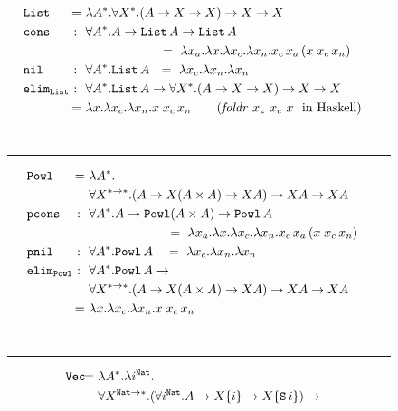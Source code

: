 \begin{figure}
\begin{align*}
&\!\!\!\!\!\!\mathtt{List} &\!\!\!\!\!=~& \l A^{*}.\forall X^{*}.(A-> X-> X)-> X-> X
	\\
&\!\!\!\!\!\!\texttt{cons} &\!\!\!\!\!:~~& \forall A^{*}.A-> \mathtt{List}\,A-> \mathtt{List}\,A \\
& & & \qquad~\qquad~\quad\, =~\l x_a.\l x.\l x_c.\l x_n. x_c\,x_a\,(x\;x_c\,x_n) \\
&\!\!\!\!\!\!\mathtt{nil} &\!\!\!\!\!:~~& \forall A^{*}.\texttt{List}\,A
~~=~ \l x_c.\l x_n.\l x_n \\
&\!\!\!\!\!\!\mathtt{elim_{List}} &\!\!\!\!:~~& \forall A^{*}.\texttt{List}\,A ->
	\forall X^{*}.(A -> X -> X) -> X -> X \\
& &\!\!\!\!\!=~& \l x.\l x_c. \l x_n.x\;x_c\,x_n\qquad
	\text{(\textit{foldr} $x_z$ $x_c$ $x~$ in Haskell)}
\end{align*}\vspace*{-19pt} \\ \vspace*{-4pt}
\rule{\linewidth}{.4pt}
\begin{align*}
&\!\!\!\!\!\!\mathtt{Powl} &\!\!\!\!\!=~& \l A^{*}.\\
&&&\forall X^{*-> *}.(A-> X(A\times A)-> XA)-> XA -> XA \\
&\!\!\!\!\!\!\texttt{pcons} &\!\!\!\!\!:~~& \forall A^{*}.A-> \mathtt{Powl}(A\times A)-> \mathtt{Powl}\,A \\
&&& \qquad~\qquad~\quad\, ~=~ \l x_a.\l x.\l x_c.\l x_n. x_c\,x_a\,(x\;x_c\,x_n) \\
&\!\!\!\!\!\!\mathtt{pnil} &\!\!\!\!\!:~~& \forall A^{*}.\texttt{Powl}\,A
~~~=~ \l x_c.\l x_n.\l x_n \\
&\!\!\!\!\!\!\mathtt{elim_{Powl}} &\!\!\!\!:~~& \forall A^{*}.\texttt{Powl}\,A -> \\
&&& \forall X^{*-> *}.(A -> X(A\times A) -> XA) -> XA -> XA \\
& &\!\!\!\!\!=~& \l x.\l x_c. \l x_n.x\;x_c\,x_n
\end{align*}\vspace*{-19pt} \\ \vspace*{-4pt}
\rule{\linewidth}{.4pt}
\begin{align*}
&\!\!\!\!\!\!\mathtt{Vec} &\!\!\!\!\!\!\!\!=~& \l A^{*}.\l i^{\mathtt{Nat}}.\\
&&&	\forall X^{\mathtt{Nat}-> *}.
	(\forall i^\mathtt{Nat}.A-> X\{i\}-> X\{\mathtt{S}\,i\}) ->  \\

\end{align*}
\end{figure}
